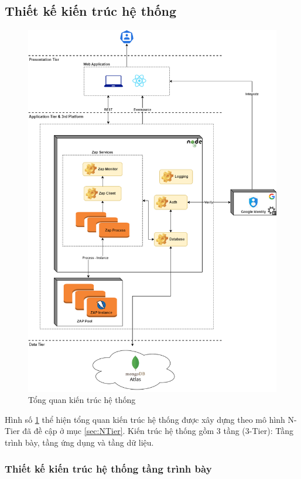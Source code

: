 \subsection{Thiết kế kiến trúc hệ thống} \label{subsec:TKKienTrucHeThong}
\begin{figure}[H]
      \centering
      \includegraphics[width=\textwidth]{applied-thesis-chapters/chapter-3/Tổng quan kiến trúc hệ thống.png}
      \caption{Tổng quan kiến trúc hệ thống}
      \label{fig:KienTrucHeThong}
\end{figure}
\tab Hình số \ref{fig:KienTrucHeThong} thể hiện tổng quan kiến trúc hệ thống được xây dựng theo mô hình N-Tier đã đề cập ở mục \ref{sec:NTier}.
Kiến trúc hệ thống gồm 3 tầng (3-Tier): Tầng trình bày, tầng ứng dụng và tầng dữ liệu.

\subsubsection{Thiết kế kiến trúc hệ thống tầng trình bày}

